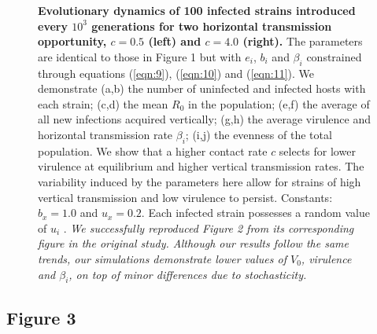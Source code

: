 \begin{figure}[tbp]
    \medskip
    \hfil
\caption{\textbf{Evolutionary dynamics of 100 infected strains introduced every
$10^3$ generations for two horizontal transmission opportunity, $c = 0.5$ (left)
and $c = 4.0$ (right).} The parameters are identical to those in Figure 1 but
with $e_i$, $b_i$ and $\beta_i$ constrained through equations (\ref{eqn:9}),
(\ref{eqn:10}) and (\ref{eqn:11}). We demonstrate (a,b) the number of uninfected
and infected hosts with each strain; (c,d) the mean $R_0$ in the population;
(e,f) the average of all new infections acquired vertically; (g,h) the average
virulence and horizontal transmission rate $\beta_i$; (i,j) the evenness of the
total population. We show that a higher contact rate $c$ selects for lower
virulence at equilibrium and higher vertical transmission rates. The variability
induced by the parameters here allow for strains of high vertical transmission
and low virulence to persist. Constants: $b_x = 1.0$ and $u_x = 0.2$. Each
infected strain possesses a random value of $u_i$ \in [$u_x$, 1].
\textit{We successfully reproduced Figure 2 from its corresponding figure in the
original study. Although our results follow the same trends, our simulations
demonstrate lower values of $V_0$, virulence and $\beta_i$, on top of minor
differences due to stochasticity.}
}
\label{fig:figure2}
\end{figure}

\subsection{Figure 3}


